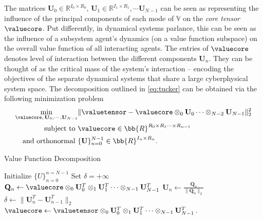 \noindent The matrices $\mathbf{U}_0 \in \mathbb{R}^{I_0 \times R_0}, \, \mathbf{U}_1 \in \mathbb{R}^{I_1 \times R_1}, \cdots \mathbf{U}_{N-1}$ can be seen as representing the influence of the principal components of each mode of $\mathds{V}$ on the \textit{core tensor} $\valuecore$.  Put differently, in dynamical systems parlance, this can be seen as the influence of a subsystem agent's dynamics (on a value function subspace)  on the overall value function of all interacting agents. The entries of $\valuecore$ denotes level of interaction between the different components $\bm{U}_n$. They can be thought of as the critical mass of the system's interaction -- encoding the objectives of the separate dynamical systems that share a large cyberphysical system space. The decomposition outlined in \eqref{eq:tucker} can be obtained via the following minimization problem
%
\begin{align}
	\min_{\valuecore,\, \mathbf{U}_0, \cdots, \mathbf{U}_{N-1}} &\| \valuetensor
	 - \valuecore \otimes_0 \mathbf{U}_0 \cdots \otimes_{N-2} \mathbf{U}_{N-1} \|^2_2 \nonumber\\
	 \text{subject to } &\valuecore \in \bb{R}^{R_0 \times R_1 \cdots \times R_{n-1}} \nonumber \\
	\text{ and orthonormal } &\{\mathbf{U}\}_{n=0}^{N-1} \in \bb{R}^{I_n\times R_n}. 
	 \label{min:tucker_decomp}
\end{align}
%

\begin{algorithm}[tb!]
	\caption{Value Function Decomposition  
		\label{alg:tucker_power_iter}}
	\begin{algorithmic}[1]
		\State Initialize $\{U\}_{n=0}^{n=N-1}$ \label{line:left_dom_eigvec}
		\State Set $\delta = +\infty$
		\While{$\delta  > \epsilon$}
		\State $\mathbf{Q}_n \leftarrow \valuecore \otimes_0 \mathbf{U}_0^T \otimes_1 \mathbf{U}_1^T \cdots \otimes_{N-1} \mathbf{U}_{N-1}^T$
		\State $\mathbf{U}_n \leftarrow \frac{\mathbf{Q}_n}{\|\mathbf{Q}_n\|_2}$
		\EndFor
		\State $\delta \leftarrow \|\mathbf{U}_n^T - \mathbf{U}_{n-1}^T\|_2$
		\EndWhile
		\State $\valuecore \leftarrow \valuetensor \otimes_0 \mathbf{U}_0^T \otimes_1 \mathbf{U}_1^T \cdots \otimes_{N-1} \mathbf{U}_{N-1}^T$. \label{tucker_decomp:line_value_core}
		\State {}
		\EndFunction
	\end{algorithmic}
\end{algorithm}


